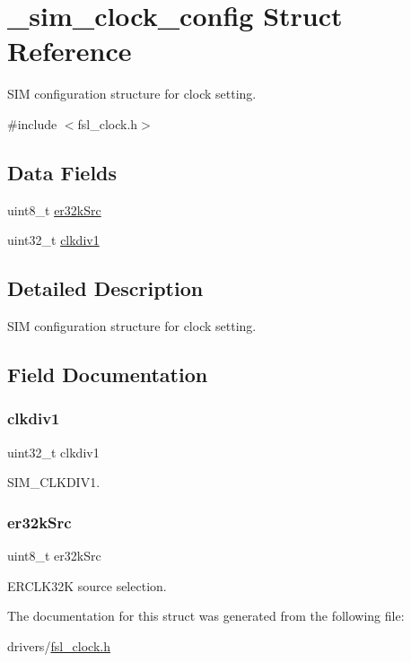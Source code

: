 \hypertarget{struct__sim__clock__config}{}\section{\+\_\+sim\+\_\+clock\+\_\+config Struct Reference}
\label{struct__sim__clock__config}


S\+IM configuration structure for clock setting.  




{\ttfamily \#include $<$fsl\+\_\+clock.\+h$>$}

\subsection*{Data Fields}
\begin{DoxyCompactItemize}
\item 
uint8\+\_\+t \mbox{\hyperlink{struct__sim__clock__config_aa28ca1dfb1001a46c2e661cad2a8970b}{er32k\+Src}}
\item 
uint32\+\_\+t \mbox{\hyperlink{struct__sim__clock__config_a917dde1dab38013038cdcb03bf670d8a}{clkdiv1}}
\end{DoxyCompactItemize}


\subsection{Detailed Description}
S\+IM configuration structure for clock setting. 

\subsection{Field Documentation}
\mbox{\label{struct__sim__clock__config_a917dde1dab38013038cdcb03bf670d8a}} 
\subsubsection{\texorpdfstring{clkdiv1}{clkdiv1}}
{\footnotesize\ttfamily uint32\+\_\+t clkdiv1}

S\+I\+M\+\_\+\+C\+L\+K\+D\+I\+V1. \mbox{\label{struct__sim__clock__config_aa28ca1dfb1001a46c2e661cad2a8970b}} 
\subsubsection{\texorpdfstring{er32kSrc}{er32kSrc}}
{\footnotesize\ttfamily uint8\+\_\+t er32k\+Src}

E\+R\+C\+L\+K32K source selection. 

The documentation for this struct was generated from the following file\+:\begin{DoxyCompactItemize}
\item 
drivers/\mbox{\hyperlink{fsl__clock_8h}{fsl\+\_\+clock.\+h}}\end{DoxyCompactItemize}
